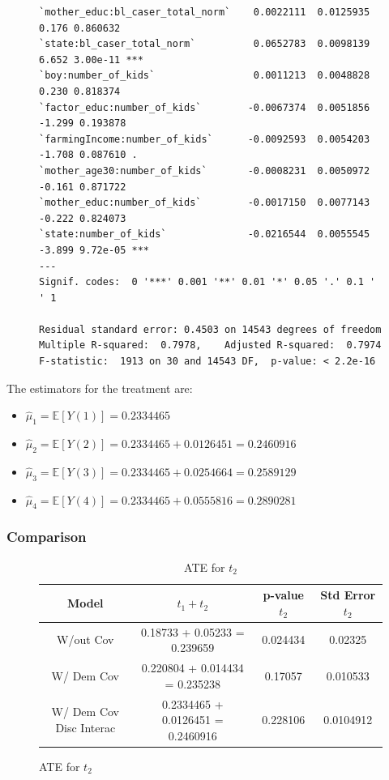 \documentclass{article}
\begin{document}
\begin{figure}[H]
\begin{lstlisting}[style=RstyleComment, caption=Regression with Demeaned Covariates and Interaction with Discrete Variables]
`mother_educ:bl_caser_total_norm`    0.0022111  0.0125935   0.176 0.860632    
`state:bl_caser_total_norm`          0.0652783  0.0098139   6.652 3.00e-11 ***
`boy:number_of_kids`                 0.0011213  0.0048828   0.230 0.818374    
`factor_educ:number_of_kids`        -0.0067374  0.0051856  -1.299 0.193878    
`farmingIncome:number_of_kids`      -0.0092593  0.0054203  -1.708 0.087610 .  
`mother_age30:number_of_kids`       -0.0008231  0.0050972  -0.161 0.871722    
`mother_educ:number_of_kids`        -0.0017150  0.0077143  -0.222 0.824073    
`state:number_of_kids`              -0.0216544  0.0055545  -3.899 9.72e-05 ***
---
Signif. codes:  0 '***' 0.001 '**' 0.01 '*' 0.05 '.' 0.1 ' ' 1

Residual standard error: 0.4503 on 14543 degrees of freedom
Multiple R-squared:  0.7978,	Adjusted R-squared:  0.7974 
F-statistic:  1913 on 30 and 14543 DF,  p-value: < 2.2e-16
\end{lstlisting}
\end{figure}

The estimators for the treatment are:
\begin{itemize}
  \item $\hat{\mu}_1 = \mathbb{E}[Y(1)] = 0.2334465$
  \item $\hat{\mu}_2 = \mathbb{E}[Y(2)] = 0.2334465 + 0.0126451 = 0.2460916$
  \item $\hat{\mu}_3 = \mathbb{E}[Y(3)] = 0.2334465 + 0.0254664 = 0.2589129$
  \item $\hat{\mu}_4 = \mathbb{E}[Y(4)] = 0.2334465 + 0.0555816 = 0.2890281$
\end{itemize}

\subsubsection*{Comparison}

\begin{figure}[H]
  \begin{table}[H]
  \centering
  \begin{tabular}{|cccc|}
    \hline
    Model & $t_1 + t_2$ & p-value $t_2$ & Std Error $t_2$ \\
    \hline
    W/out Cov                & 0.18733 + 0.05233 = 0.239659 & 0.024434         & 0.02325 \\ 
    W/ Dem Cov               & 0.220804 + 0.014434 = 0.235238 & 0.17057        & 0.010533 \\   
    W/ Dem Cov Disc Interac  & 0.2334465 + 0.0126451 = 0.2460916 & 0.228106    & 0.0104912 \\       
    \hline
  \end{tabular}
  \caption{ATE for $t_2$}
\end{table}
\end{figure}
\end{document}
